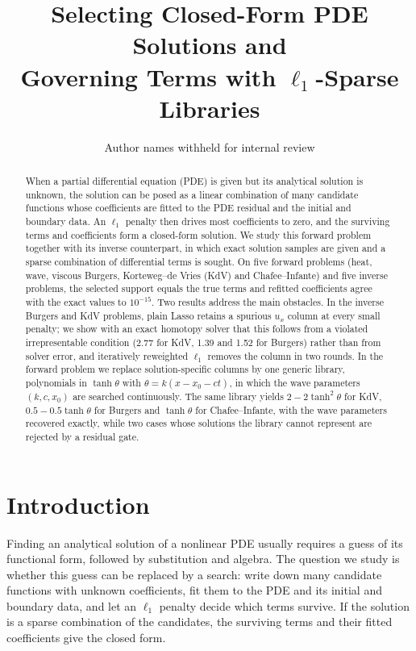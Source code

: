 \documentclass{article}
\title{Selecting Closed-Form PDE Solutions and\\Governing Terms with $\ell_1$-Sparse Libraries}
\author{%
  Author names withheld for internal review
}
\begin{document}
\maketitle

\begin{abstract}
When a partial differential equation (PDE) is given but its analytical solution is unknown, the solution can be posed as a linear combination of many candidate functions whose coefficients are fitted to the PDE residual and the initial and boundary data. An $\ell_1$ penalty then drives most coefficients to zero, and the surviving terms and coefficients form a closed-form solution. We study this forward problem together with its inverse counterpart, in which exact solution samples are given and a sparse combination of differential terms is sought. On five forward problems (heat, wave, viscous Burgers, Korteweg--de Vries (KdV) and Chafee--Infante) and five inverse problems, the selected support equals the true terms and refitted coefficients agree with the exact values to $10^{-15}$. Two results address the main obstacles. In the inverse Burgers and KdV problems, plain Lasso retains a spurious $u_x$ column at every small penalty; we show with an exact homotopy solver that this follows from a violated irrepresentable condition (2.77 for KdV, 1.39 and 1.52 for Burgers) rather than from solver error, and iteratively reweighted $\ell_1$ removes the column in two rounds. In the forward problem we replace solution-specific columns by one generic library, polynomials in $\tanh\theta$ with $\theta = k(x - x_0 - ct)$, in which the wave parameters $(k, c, x_0)$ are searched continuously. The same library yields $2 - 2\tanh^2\theta$ for KdV, $0.5 - 0.5\tanh\theta$ for Burgers and $\tanh\theta$ for Chafee--Infante, with the wave parameters recovered exactly, while two cases whose solutions the library cannot represent are rejected by a residual gate.
\end{abstract}

\section{Introduction}

Finding an analytical solution of a nonlinear PDE usually requires a guess of its functional form, followed by substitution and algebra. The question we study is whether this guess can be replaced by a search: write down many candidate functions with unknown coefficients, fit them to the PDE and its initial and boundary data, and let an $\ell_1$ penalty decide which terms survive. If the solution is a sparse combination of the candidates, the surviving terms and their fitted coefficients give the closed form.
\end{document}
